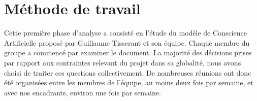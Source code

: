 \section{Méthode de travail}
Cette première phase d'analyse a consisté en l'étude du modèle de Conscience Artificielle proposé par Guillaume Tisserant et son équipe. Chaque membre du groupe a commencé par examiner le document. La majorité des décisions prises par rapport aux contraintes relevant du projet dans sa globalité, nous avons choisi de traiter ces questions collectivement. De nombreuses réunions ont donc été organisées entre les membres de l'équipe, au moins deux fois par semaine, et avec nos encadrants, environ une fois par semaine.
